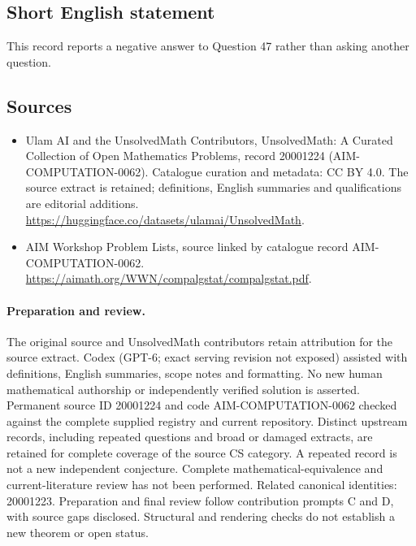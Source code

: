 \documentclass[11pt]{article}
\begin{document}
\subsection{Short English statement}
This record reports a negative answer to Question 47 rather than asking another question.
\subsection{Sources}
\begin{itemize}
\item[\hypertarget{source:20001224:1}{S1}] Ulam AI and the UnsolvedMath Contributors, UnsolvedMath: A Curated Collection of Open Mathematics Problems, record 20001224 (AIM-COMPUTATION-0062). Catalogue curation and metadata: CC BY 4.0. The source extract is retained; definitions, English summaries and qualifications are editorial additions.
\url{https://huggingface.co/datasets/ulamai/UnsolvedMath}.
\item[\hypertarget{source:20001224:2}{S2}] AIM Workshop Problem Lists, source linked by catalogue record AIM-COMPUTATION-0062.
\url{https://aimath.org/WWN/compalgstat/compalgstat.pdf}.
\end{itemize}
\paragraph{Preparation and review.}
The original source and UnsolvedMath contributors retain attribution for the source extract. Codex (GPT-6; exact serving revision not exposed) assisted with definitions, English summaries, scope notes and formatting. No new human mathematical authorship or independently verified solution is asserted. Permanent source ID 20001224 and code AIM-COMPUTATION-0062 checked against the complete supplied registry and current repository. Distinct upstream records, including repeated questions and broad or damaged extracts, are retained for complete coverage of the source CS category. A repeated record is not a new independent conjecture. Complete mathematical-equivalence and current-literature review has not been performed. Related canonical identities: 20001223. Preparation and final review follow contribution prompts C and D, with source gaps disclosed. Structural and rendering checks do not establish a new theorem or open status.
\label{end:20001224}
\end{document}
